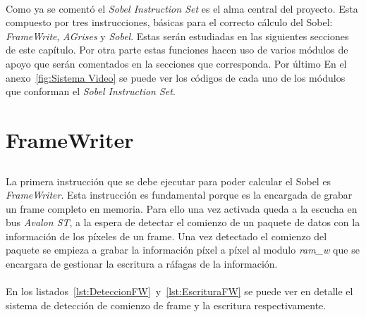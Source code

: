 \documentclass[a4paper,12pt,titlepage,final]{book}
\begin{document}
\paragraph{}
Como ya se comentó el \textit{Sobel Instruction Set} es el alma central del proyecto. Esta compuesto por tres instrucciones, básicas para el correcto cálculo del Sobel: \textit{FrameWrite}, \textit{AGrises} y \textit{Sobel}. Estas serán estudiadas en las siguientes secciones de este capítulo. Por otra parte estas funciones hacen uso de varios módulos de apoyo que serán comentados en la secciones que corresponda. Por último En el anexo~\ref{fig:Sistema Video} se puede ver los códigos de cada uno de los módulos que conforman el \textit{Sobel Instruction Set}.

\section{FrameWriter}
\subsection*{}
\subsubsection*{}

\paragraph{}
La primera instrucción que se debe ejecutar para poder calcular el Sobel es \textit{FrameWriter}. Esta instrucción es fundamental porque es la encargada de grabar un frame completo en memoria. Para ello una vez activada queda a la escucha en bus \textit{Avalon ST}, a la espera de detectar el comienzo de un paquete de datos con la información de los píxeles de un frame. Una vez detectado el comienzo del paquete se empieza a grabar la información píxel a píxel al modulo \textit{ram\_w} que se encargara de gestionar la escritura a ráfagas de la información.

\paragraph{}
En los listados~\ref{lst:DeteccionFW}~y~\ref{lst:EscrituraFW} se puede ver en detalle el sistema de detección de comienzo de frame y la escritura respectivamente. 


\end{document}
